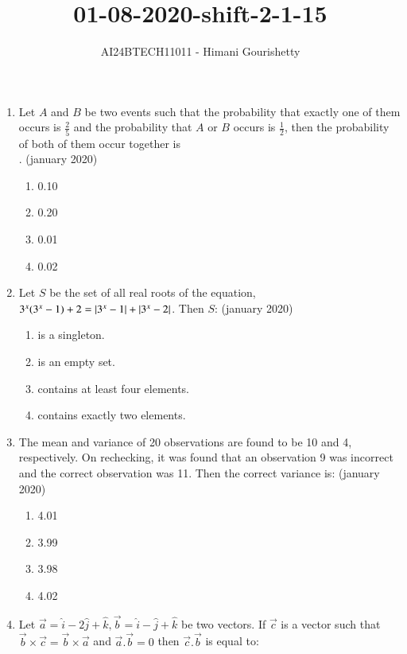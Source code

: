 \documentclass[journal,12pt,onecolumn]{IEEEtran}
\theoremstyle{remark}
\begin{document}

\vspace{3cm}

\title{01-08-2020-shift-2-1-15}
\author{AI24BTECH11011 - Himani Gourishetty}
\maketitle
\bigskip

\renewcommand{\thefigure}{\theenumi}
\renewcommand{\thetable}{\theenumi}
\begin{enumerate}
    \item Let $A$ and $B$ be two events such that the probability that exactly one of them occurs is $\frac{2}{5}$ and the probability that $A$ or $B$ occurs is $\frac{1}{2}$, then the probability of both of them occur together is\\.
	    \hfill{(january 2020)}
	    \begin{enumerate}
	\item 0.10
        \item 0.20
        \item 0.01
        \item 0.02
    \end{enumerate}
    \item  Let $S$ be the set of all real roots of the equation, $3^x(3^x-1) + 2 = \left\vert3^x-1\right\vert + \left\vert3^x-2\right\vert$. Then $S$:
	    \hfill{(january 2020)}
    \begin{enumerate}
        \item is a singleton.
        \item is an empty set.
        \item contains at least four elements.
        \item contains exactly two elements.
    \end{enumerate}
    \item The mean and variance of 20 observations are found to be 10 and 4, respectively. On rechecking, it was found that an observation 9 was incorrect and the correct observation was 11. Then the correct variance is:
	    \hfill{(january 2020)}
		\begin{enumerate}
        \item 4.01
        \item 3.99
        \item 3.98
        \item 4.02
    \end{enumerate}
    \item Let $\vec{a}=\hat{i}-2\hat{j}+\hat{k},\vec{b}=\hat{i}-\hat{j}+\hat{k}$ be two vectors. If $\vec{c}$ is a vector such that $\vec{b}\times\vec{c} = \vec{b} \times \vec{a}$ and $\vec{a}.\vec{b}=0$ then $\vec{c}.\vec{b}$ is equal to:

\end{enumerate}
\end{document}
